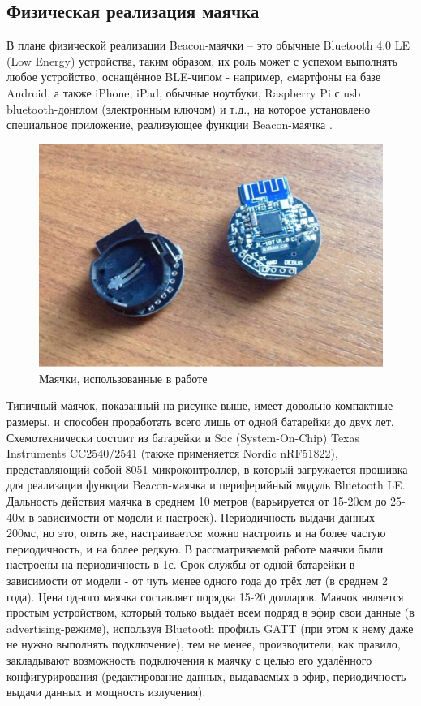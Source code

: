 \subsection{Физическая реализация маячка}

В плане физической реализации Beacon-маячки – это обычные Bluetooth 4.0 LE (Low Energy) устройства, таким образом, их роль может с успехом выполнять любое устройство, оснащённое BLE-чипом - например, cмартфоны на базе Android, а также iPhone, iPad, обычные ноутбуки, Raspberry Pi с usb bluetooth-донглом (электронным ключом) и т.д., на которое установлено специальное приложение, реализующее функции Beacon-маячка \cite{web:HabrBig}.

\begin{figure}[h]
    \centering
    \includegraphics[scale=0.4]{img/beacons.png}
    \caption{Маячки, использованные в работе}
\end{figure}

Типичный маячок, показанный на рисунке выше, имеет довольно компактные размеры, и способен проработать всего лишь от одной батарейки до двух лет. Схемотехнически состоит из батарейки и Soc (System-On-Chip) Texas Instruments CC2540/2541 (также применяется Nordic nRF51822), представляющий собой 8051 микроконтроллер, в который загружается прошивка для реализации функции Beacon-маячка и периферийный модуль Bluetooth LE. Дальность действия маячка в среднем 10 метров (варьируется от 15-20см до 25-40м в зависимости от модели и настроек). Периодичность выдачи данных - 200мс, но это, опять же, настраивается: можно настроить и на более частую периодичность, и на более редкую. В рассматриваемой работе маячки были настроены на периодичность в 1с. Срок службы от одной батарейки в зависимости от модели - от чуть менее одного года до трёх лет (в среднем 2 года). Цена одного маячка составляет порядка 15-20 долларов. Маячок является простым устройством, который только выдаёт всем подряд в эфир свои данные (в advertising-режиме), используя Bluetooth профиль GATT (при этом к нему даже не нужно выполнять подключение), тем не менее, производители, как правило, закладывают возможность подключения к маячку с целью его удалённого конфигурирования (редактирование данных, выдаваемых в эфир, периодичность выдачи данных и мощность излучения).